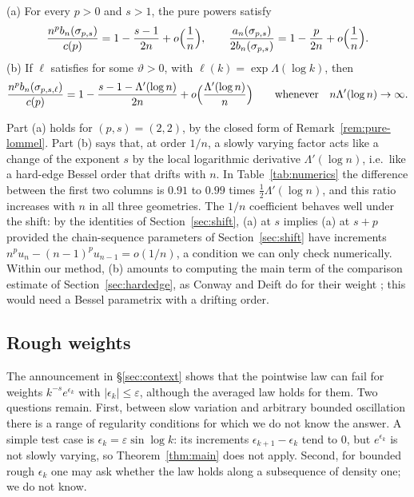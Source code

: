\begin{conjecture}\label{conj:tilt}
\textup{(a)} For every $p>0$ and $s>1$, the pure powers satisfy
\[
  \frac{n^pb_n(\sigma_{p,s})}{c(p)}=1-\frac{s-1}{2n}+o\Bigl(\frac1n\Bigr),\qquad
  \frac{a_n(\sigma_{p,s})}{2b_n(\sigma_{p,s})}=1-\frac{p}{2n}+o\Bigl(\frac1n\Bigr).
\]
\textup{(b)} If $\ell$ satisfies \Ath{\vartheta} for some $\vartheta>0$, with $\ell(k)=\exp\Lambda(\log k)$, then
\[
  \frac{n^pb_n(\sigma_{p,s,\ell})}{c(p)}=1-\frac{s-1-\Lambda'(\log n)}{2n}+o\Bigl(\frac{\Lambda'(\log n)}{n}\Bigr)
  \qquad\text{whenever}\quad n\Lambda'(\log n)\to\infty.
\]
\end{conjecture}

Part (a) holds for $(p,s)=(2,2)$, by the closed form of Remark~\ref{rem:pure-lommel}. Part (b) says that, at order
$1/n$, a slowly varying factor acts like a change of the exponent $s$ by the local logarithmic derivative
$\Lambda'(\log n)$, i.e.\ like a hard-edge Bessel order that drifts with $n$. In Table~\ref{tab:numerics} the
difference between the first two columns is $0.91$ to $0.99$ times $\frac12\Lambda'(\log n)$, and this ratio
increases with $n$ in all three geometries. The $1/n$ coefficient behaves well under the shift: by the identities of
Section~\ref{sec:shift}, (a) at $s$ implies (a) at $s+p$ provided the chain-sequence parameters of
Section~\ref{sec:shift} have increments $n^pu_n-(n-1)^pu_{n-1}=o(1/n)$, a condition we can only check numerically.
Within our method, (b) amounts to computing the main term of the comparison estimate of Section~\ref{sec:hardedge}, as
Conway and Deift do for their weight \cite[(5.5)]{CD}; this would need a Bessel parametrix with a drifting order.

\subsection{Rough weights}\label{sec:rough}
The announcement in \S\ref{sec:context} shows that the pointwise law can fail for weights $k^{-s}e^{\epsilon_k}$ with
$|\epsilon_k|\le\varepsilon$, although the averaged law holds for them. Two questions remain. First, between slow
variation and arbitrary bounded oscillation there is a range of regularity conditions for which we do not know the
answer. A simple test case is $\epsilon_k=\varepsilon\sin\log k$: its increments $\epsilon_{k+1}-\epsilon_k$ tend to
$0$, but $e^{\epsilon_k}$ is not slowly varying, so Theorem~\ref{thm:main} does not apply. Second, for bounded rough
$\epsilon_k$ one may ask whether the law holds along a subsequence of density one; we do not know.

